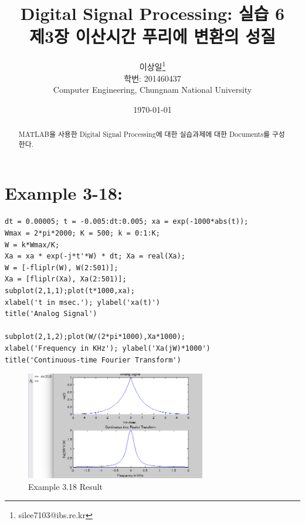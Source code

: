 \documentclass[11pt
  , a4paper
  , article
  , oneside
]{memoir}
\begin{document}
\newcommand{\technumber}{
  Digital Signal Processing using MATLAB\\
  Document 1: 2016-03-26}
\title{\textbf{Digital Signal Processing: 실습 6 \\
		제3장 이산시간 푸리에  변환의 성질 \\}}

\author{이상일\thanks{silee7103@ibs.re.kr} \\

  학번: 201460437\\
  Computer Engineering, Chungnam National University 
}
\date{\today}

\renewcommand{\maketitlehooka}{\begin{flushright}\textsf{\technumber}\end{flushright}}

\maketitle

\begin{abstract}
MATLAB을 사용한 Digital Signal Processing에 대한 실습과제에 대한 Documents를 구성한다.
\end{abstract}

\chapter{Example 3-18:}

\begin{lstlisting}[style=termstyle]
% Example 3.18
dt = 0.00005; t = -0.005:dt:0.005; xa = exp(-1000*abs(t));
Wmax = 2*pi*2000; K = 500; k = 0:1:K;
W = k*Wmax/K;
Xa = xa * exp(-j*t'*W) * dt; Xa = real(Xa);
W = [-fliplr(W), W(2:501)];
Xa = [fliplr(Xa), Xa(2:501)];
subplot(2,1,1);plot(t*1000,xa);
xlabel('t in msec.'); ylabel('xa(t)')
title('Analog Signal')

subplot(2,1,2);plot(W/(2*pi*1000),Xa*1000);
xlabel('Frequency in KHz'); ylabel('Xa(jW)*1000')
title('Continuous-time Fourier Transform')
\end{lstlisting}

\begin{figure}[h!]
	\centering
	\includegraphics[width=0.7\textwidth,height=0.4\textwidth]{./images/ex318.png}
	\caption{Example 3.18 Result}
	\label{fig:Example 3-18 Result}
\end{figure}
\end{document}
